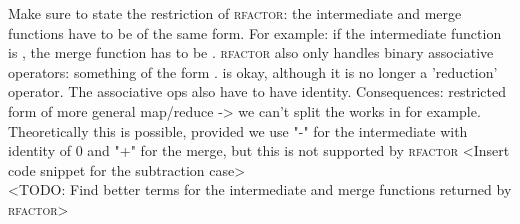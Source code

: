 Make sure to state the restriction of \textsc{rfactor}: the intermediate and merge functions have to be of the same form. For example: if the intermediate function is , the merge function has to be . \textsc{rfactor} also only handles binary associative operators: something of the form .  is okay, although it is no longer a 'reduction' operator. The associative ops also have to have identity. Consequences: restricted form of more general map/reduce -> we can't split the works in  for example. Theoretically this is possible, provided we use "-" for the intermediate with identity of 0 and "+" for the merge, but this is not supported by \textsc{rfactor} <Insert code snippet for the subtraction case> \\

<TODO: Find better terms for the intermediate and merge functions returned by \textsc{rfactor}> \\

